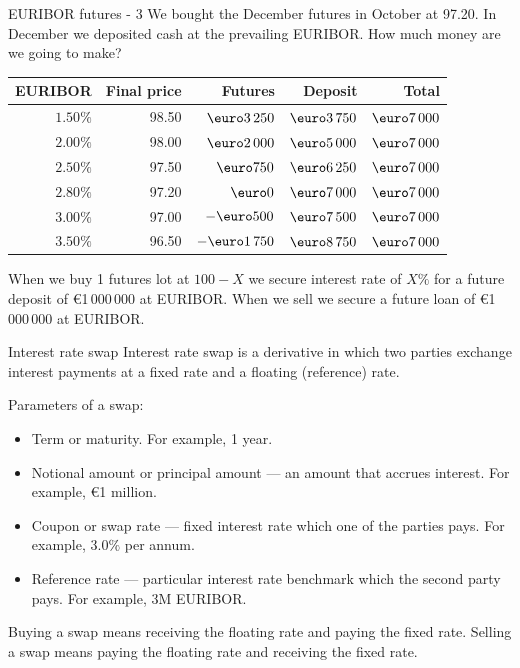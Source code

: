 \documentclass{beamer}
\renewcommand{\EUR}[1]{\textup{\euro}#1}
\begin{document}
\begin{frame}{EURIBOR futures - 3}
\justify
We bought the December futures in October at \alert{97.20}. In December we deposited cash at the prevailing EURIBOR. How much money are we going to make?
\justify
\centering
\begin{tabular}{r|r|r|r|r}
EURIBOR   & Final price & Futures         & Deposit & Total \\ \hline
$1.50\%$ & 98.50        & $\EUR{3\,250}$      &   $\EUR{3\,750}$  & $\EUR{7\,000}$ \\
$2.00\%$ & 98.00        & $\EUR{2\,000}$      &   $\EUR{5\,000}$  & $\EUR{7\,000}$ \\
$2.50\%$ & 97.50        & $\EUR{750}$      & $\EUR{6\,250}$  & $\EUR{7\,000}$ \\
$2.80\%$ & 97.20        & $\EUR{0}$                & $\EUR{7\,000}$  & $\EUR{7\,000}$ \\
$3.00\%$ & 97.00        & $-\EUR{500}$    & $\EUR{7\,500}$ & $\EUR{7\,000}$ \\
$3.50\%$ & 96.50        & $-\EUR{1\,750}$    & $\EUR{8\,750}$ & $\EUR{7\,000}$
\end{tabular}

\justify
When we buy 1 futures lot at $100-X$ we secure interest rate of $X\%$ for a future deposit of \EUR{1\,000\,000} at EURIBOR. When we sell we secure a future loan of \EUR{1\,000\,000} at EURIBOR.
\end{frame}



\begin{frame}{Interest rate swap}
\justify
\alert{Interest rate swap} is a derivative in which two parties exchange interest payments at a fixed rate and a floating (reference) rate.

\justify
Parameters of a swap:
\begin{itemize}
\justifying
\item Term or maturity. For example, 1 year.
\item Notional amount or principal amount --- an amount that accrues interest. For example, \EUR{1} million.
\item Coupon or swap rate --- fixed interest rate which one of the parties pays. For example, $3.0\%$ per annum.
\item Reference rate --- particular interest rate benchmark which the second party pays. For example, 3M EURIBOR.
\end{itemize}

\justify
Buying a swap means receiving the floating rate and paying the fixed rate. Selling a swap means paying the floating rate and receiving the fixed rate.
\end{frame}
\end{document}
